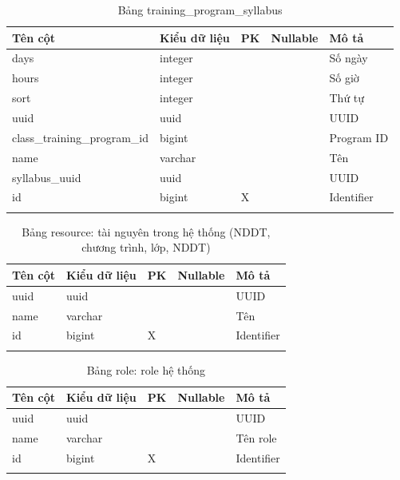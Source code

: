 \documentclass[report.tex]{subfiles}
\begin{document}
\begin{table}[!htb]
\begin{longtable}{|p{3cm}|p{3cm}|p{1cm}|p{1.6cm}|p{6cm}|}
\hline
\textbf{Tên cột} & \textbf{Kiểu dữ liệu} & \textbf{PK} & \textbf{Nullable} & \textbf{Mô tả} \\
\hline
days & integer & & & Số ngày \\
hours & integer & & & Số giờ \\
sort & integer & & & Thứ tự \\
uuid & uuid & & & UUID \\
class\_training\_program\_id & bigint & & & Program ID \\
name & varchar & & & Tên \\
syllabus\_uuid & uuid & & & UUID \\
id & bigint & X & & Identifier \\
\hline
\caption[Bảng training\_program\_syllabus]{Bảng training\_program\_syllabus}
\end{longtable}
\end{table}
\FloatBarrier

\begin{table}[!htb]
\begin{longtable}{|p{3cm}|p{3cm}|p{1cm}|p{1.6cm}|p{6cm}|}
\hline
\textbf{Tên cột} & \textbf{Kiểu dữ liệu} & \textbf{PK} & \textbf{Nullable} & \textbf{Mô tả} \\
\hline
uuid & uuid & & & UUID \\
name & varchar & & & Tên \\
id & bigint & X & & Identifier \\
\hline
\caption[Bảng resource]{Bảng resource: tài nguyên trong hệ thống (NDDT, chương trình, lớp, NDDT)}
\end{longtable}
\end{table}
\FloatBarrier

\begin{table}[!htb]
\begin{longtable}{|p{3cm}|p{3cm}|p{1cm}|p{1.6cm}|p{6cm}|}
\hline
\textbf{Tên cột} & \textbf{Kiểu dữ liệu} & \textbf{PK} & \textbf{Nullable} & \textbf{Mô tả} \\
\hline
uuid & uuid & & & UUID \\
name & varchar & & & Tên role \\
id & bigint & X & & Identifier \\
\hline
\caption[Bảng role]{Bảng role: role hệ thống}
\end{longtable}
\end{table}
\FloatBarrier
\end{document}

